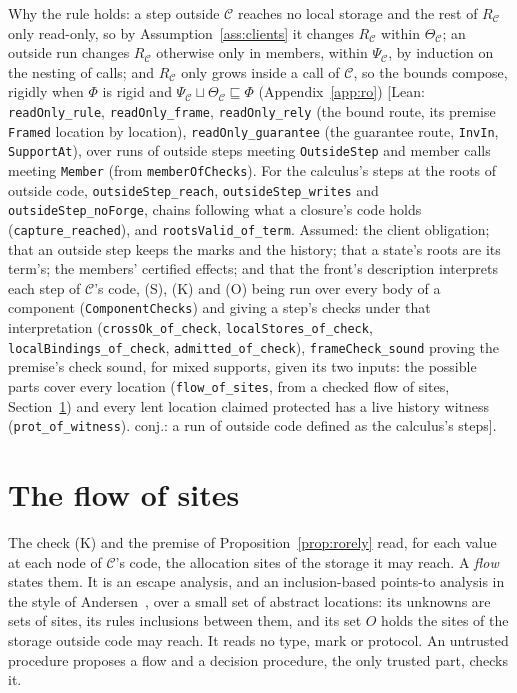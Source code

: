 \documentclass[10pt,a4paper]{article}
\theoremstyle{definition}
\theoremstyle{remark}
\newcommand{\lean}[1]{\texttt{\small #1}}
\newcommand{\status}[1]{\textsf{\small[#1]}}
\newcommand{\cC}{\mathcal{C}}
\begin{document}
\noindent
Why the rule holds: a step outside $\cC$ reaches no local storage and
the rest of $R_\cC$ only read-only, so by Assumption~\ref{ass:clients}
it changes $R_\cC$ within $\Theta_\cC$; an outside run changes $R_\cC$
otherwise only in members, within $\Psi_\cC$, by induction on the nesting
of calls; and $R_\cC$ only grows inside a call of $\cC$, so the bounds
compose, rigidly when $\Phi$ is rigid and $\Psi_\cC\sqcup\Theta_\cC\sqsubseteq\Phi$
(Appendix~\ref{app:ro})
\status{Lean: \lean{readOnly\_rule}, \lean{readOnly\_frame}, \lean{readOnly\_rely} (the bound route, its premise \lean{Framed} location by location), \lean{readOnly\_guarantee} (the guarantee route, \lean{InvIn}, \lean{SupportAt}), over runs of outside steps meeting \lean{OutsideStep} and member calls meeting \lean{Member} (from \lean{memberOfChecks}). For the calculus's steps at the roots of outside code, \lean{outsideStep\_reach}, \lean{outsideStep\_writes} and \lean{outsideStep\_noForge}, chains following what a closure's code holds (\lean{capture\_reached}), and \lean{rootsValid\_of\_term}. Assumed: the client obligation; that an outside step keeps the marks and the history; that a state's roots are its term's; the members' certified effects; and that the front's description interprets each step of $\cC$'s code, (S), (K) and (O) being run over every body of a component (\lean{ComponentChecks}) and giving a step's checks under that interpretation (\lean{crossOk\_of\_check}, \lean{localStores\_of\_check}, \lean{localBindings\_of\_check}, \lean{admitted\_of\_check}), \lean{frameCheck\_sound} proving the premise's check sound, for mixed supports, given its two inputs: the possible parts cover every location (\lean{flow\_of\_sites}, from a checked flow of sites, Section~\ref{sec:flow}) and every lent location claimed protected has a live history witness (\lean{prot\_of\_witness}). conj.: a run of outside code defined as the calculus's steps}.

\section{The flow of sites}\label{sec:flow}

The check (K) and the premise of Proposition~\ref{prop:rorely} read, for
each value at each node of $\cC$'s code, the allocation sites of the
storage it may reach. A \emph{flow} states them. It is an escape analysis,
and an inclusion-based points-to analysis in the style of
Andersen~\cite{andersen}, over a small set of abstract locations: its
unknowns are sets of sites, its rules inclusions between them, and its set
$O$ holds the sites of the storage outside code may reach. It reads no
type, mark or protocol. An untrusted procedure proposes a flow and a
decision procedure, the only trusted part, checks it.
\end{document}
